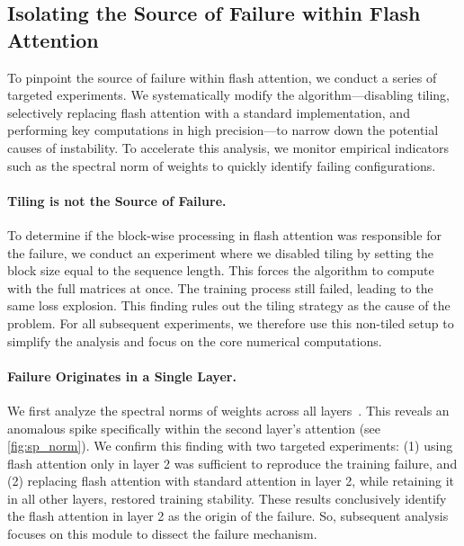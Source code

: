 \documentclass{article} %
\begin{document}
\subsection{Isolating the Source of Failure within Flash Attention}\label{ssec:narrow}

To pinpoint the source of failure within flash attention, we conduct a series of targeted experiments. We systematically modify the algorithm—disabling tiling, selectively replacing flash attention with a standard implementation, and performing key computations in high precision—to narrow down the potential causes of instability. To accelerate this analysis, we monitor empirical indicators such as the spectral norm of weights to quickly identify failing configurations.


\vspace{-10px}
\paragraph{Tiling is not the Source of Failure.} 
To determine if the block-wise processing in flash attention was responsible for the failure, we conduct an experiment where we disabled tiling by setting the block size equal to the sequence length. This forces the algorithm to compute with the full matrices at once. The training process still failed, leading to the same loss explosion. This finding rules out the tiling strategy as the cause of the problem. For all subsequent experiments, we therefore use this non-tiled setup to simplify the analysis and focus on the core numerical computations.

\vspace{-10px}
\paragraph{Failure Originates in a Single Layer.} 
We first analyze the spectral norms of weights across all layers~\citep{yang2023spectral,rybakov2024methods}. 
This reveals an anomalous spike specifically within the second layer's attention (see \cref{fig:sp_norm}). 
We confirm this finding with two targeted experiments: 
(1) using flash attention only in layer 2 was sufficient to reproduce the training failure, and 
(2) replacing flash attention with standard attention in layer 2, while retaining it in all other layers, restored training stability. 
These results conclusively identify the flash attention in layer 2 as the origin of the failure. So, subsequent analysis focuses on this module to dissect the failure mechanism.
\end{document}
